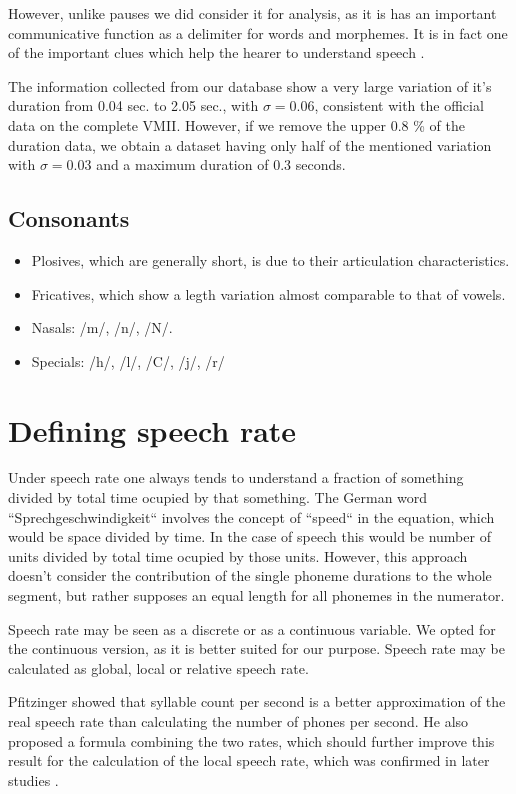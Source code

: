 \documentclass[a4paper]{scrreprt}
\begin{document}
However, unlike pauses we did consider it  for analysis, as it is has an important communicative function as a delimiter for words and morphemes. It is in fact one of the important clues which help the hearer to understand speech \cite{Ternes2012}. 

The information collected from our database show a very large variation of it's duration from 0.04 sec. to 2.05 sec., with $\sigma = 0.06$, consistent with the official data on the complete VMII. However, if we remove the upper 0.8 \% of the duration data, we obtain a dataset having only half of the mentioned variation with $\sigma = 0.03$ and a maximum duration of 0.3 seconds. 
\section{Consonants}
\begin{itemize}
	\item Plosives, which are generally short, is due to their articulation characteristics.
	\item Fricatives, which show a legth variation almost comparable to that of vowels.
	\item Nasals: /m/, /n/, /N/.
	\item Specials: /h/, /l/, /C/, /j/, /r/
\end{itemize}


\chapter{Defining speech rate}
Under speech rate one always tends to understand a fraction of something divided by total time ocupied by that something. The German word ``Sprechgeschwindigkeit`` involves the concept of ``speed`` in the equation, which would be space divided by time. In the case of speech this would be number of units divided by total time ocupied by those units. However, this approach doesn't consider the contribution of the single phoneme durations to the whole segment, but rather supposes an equal length for all phonemes in the numerator.

Speech rate may be seen as a discrete or as a continuous variable. We opted for the continuous version, as it is better suited for our purpose.
Speech rate may be calculated as global, local or relative speech rate.

Pfitzinger \cite{Pfitzinger1998} showed that syllable count per second is a better approximation of the real speech rate than calculating the number of phones per second. He also proposed a formula combining the two rates, which should further improve this result for the calculation of the local speech rate, which was confirmed in later studies \cite{Pfitzinger1999}.
\end{document}
